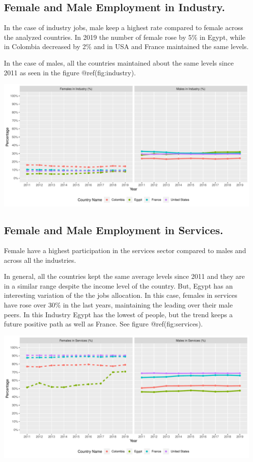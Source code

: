 \documentclass[
]{article}
\begin{document}
\hypertarget{female-and-male-employment-in-industry.}{%
\subsection{Female and Male Employment in
Industry.}\label{female-and-male-employment-in-industry.}}

In the case of industry jobs, male keep a highest rate compared to
female across the analyzed countries. In 2019 the number of female rose
by 5\% in Egypt, while in Colombia decreased by 2\% and in USA and
France maintained the same levels.

In the case of males, all the countries maintained about the same levels
since 2011 as seen in the figure @ref(fig:industry).

\includegraphics{The_Outsiders_5513_files/figure-latex/industry-1.pdf}

\hypertarget{female-and-male-employment-in-services.}{%
\subsection{Female and Male Employment in
Services.}\label{female-and-male-employment-in-services.}}

Female have a highest participation in the services sector compared to
males and across all the industries.

In general, all the countries kept the same average levels since 2011
and they are in a similar range despite the income level of the country.
But, Egypt has an interesting variation of the the jobs allocation. In
this case, females in services have rose over 30\% in the last years,
maintaining the leading over their male peers. In this Industry Egypt
has the lowest of people, but the trend keeps a future positive path as
well as France. See figure @ref(fig:services).

\includegraphics{The_Outsiders_5513_files/figure-latex/services-1.pdf}
\end{document}

